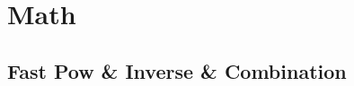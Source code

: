 \documentclass[a4paper,10pt,twocolumn,oneside]{article}
\begin{document}
% 

%

% 

% 

% 

% 

\section{Math}
\subsection{Fast Pow \& Inverse \& Combination}


% 

% 
\end{document}
